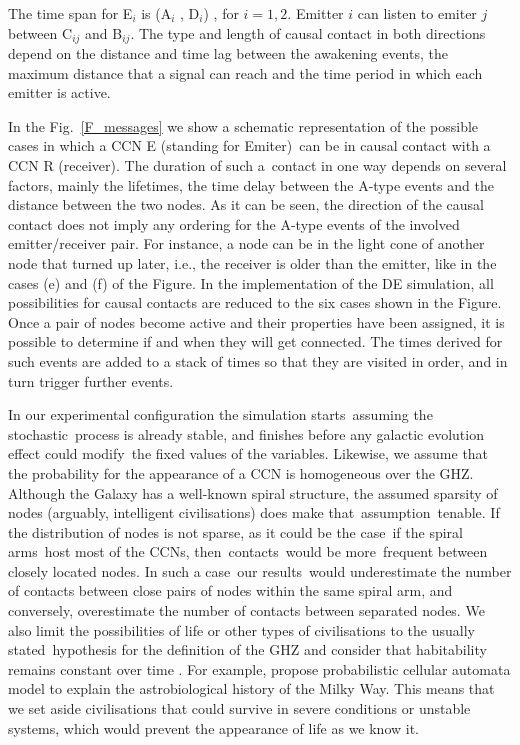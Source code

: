 \documentclass[crop]{CSLB}
\newcommand{\ceti}{CCN}
\newcommand{\cetis}{CCNs}
\newcommand{\ffn}[1]{}
\begin{document}
%
The time span for E$_i$ is (A$_i$ , D$_i$) , for $i = {1, 2}$.
%
Emitter $i$ can listen to emiter $j$ between C$_{ij}$ and B$_{ij}$.
%
The type and length of causal contact in both directions depend on the distance and time lag between the awakening events, the maximum distance that a signal can reach and the time period in which each emitter is active.
%
\ffn{2}
%
In the Fig.~\ref{F_messages} we show a schematic representation of the possible cases in which a \ceti{} E (standing for Emiter) can be in causal contact with a \ceti{} R (receiver).
%
The duration of such a contact in one way depends on several factors, mainly the lifetimes, the time delay between the A-type events and the distance between the two nodes.
%
As it can be seen, the direction of the causal contact does not imply any ordering for the A-type events of the involved emitter/receiver pair.
%
For instance, a node can be in the light cone of another node that turned up later, i.e., the receiver is older than the emitter, like in the cases (e) and (f) of the Figure.
%
In the implementation of the DE simulation, all possibilities for causal contacts are reduced to the six cases shown in the Figure.
%
Once a pair of nodes become active and their properties have been assigned, it is possible to determine if and when they will get connected.
%
The times derived for such events are added to a stack of times so that they are visited in order, and in turn trigger further events.
%



In our experimental configuration the simulation starts assuming the stochastic process is already stable, and finishes before any galactic evolution effect could modify the fixed values of the variables.
%
Likewise, we assume that the probability for the appearance of a \ceti{} is homogeneous over the GHZ.
%
Although the Galaxy has a well-known spiral structure, the assumed sparsity of nodes (arguably, intelligent civilisations) does make that assumption tenable.
%
If the distribution of nodes is not sparse, as it could be the case if the spiral arms host most of the \cetis{}, then contacts would be more frequent between closely located nodes.
%
In such a case our results would underestimate the number of contacts between close pairs of nodes within the same spiral arm, and conversely, overestimate the number of contacts between separated nodes.
%
We also limit the possibilities of life or other types of civilisations to the usually stated hypothesis for the definition of
the GHZ \citep{dayal_habitability_2016, gonzalez_galactic_2001, lineweaver_galactic_2004, gonzalez_habitable_2005,
morrison_extending_2015, haqq-misra_evolution_2019, rahvar_cosmic_2016, gobat_evolution_2016, rahvar_cosmic_2016} and consider that habitability remains constant over time \citep[see, however, ][]{gonzalez_habitable_2005, dayal_habitability_2016, gobat_evolution_2016}.
%
For example, \citet{vukotic_astrobiological_2012} propose
probabilistic cellular automata model to explain the astrobiological
history of the Milky Way. %
%
This means that we set aside civilisations that could survive in severe conditions or unstable systems, which would prevent the appearance of life as we know it.  
\end{document}
